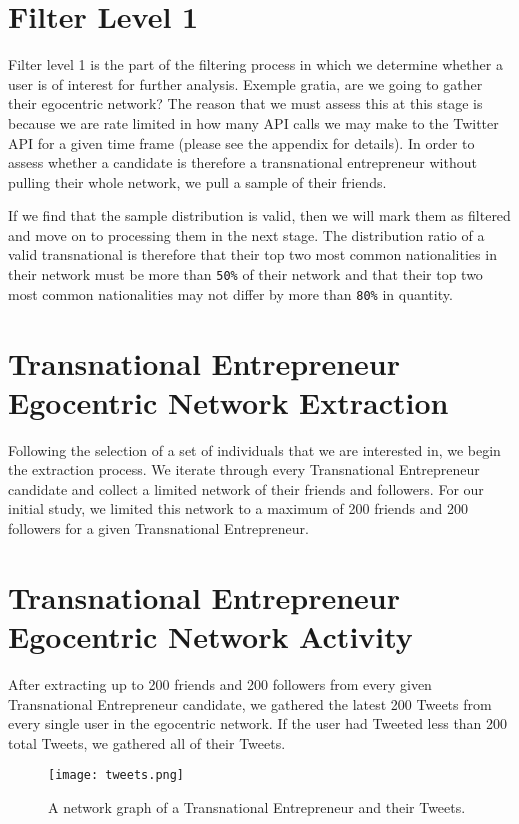 \section{Filter Level 1}
Filter level 1 is the part of the filtering process in which we
determine whether a user is of interest for further analysis. Exemple
gratia, are we going to gather their egocentric network? The reason
that we must assess this at this stage is because we are rate limited
in how many API calls we may make to the Twitter API for a given time
frame (please see the appendix for details). In order to assess
whether a candidate is therefore a transnational entrepreneur without
pulling their whole network, we pull a sample of their friends.

If we find that the sample distribution is valid, then we will mark
them as filtered and move on to processing them in the next stage. The
distribution ratio of a valid transnational is therefore that their
top two most common nationalities in their network must be more than
\verb|50%| of their network and that their top two most common
nationalities may not differ by more than \verb|80%| in quantity.

\section{Transnational Entrepreneur Egocentric Network Extraction}
Following the selection of a set of individuals that we are interested
in, we begin the extraction process. We iterate through every
Transnational Entrepreneur candidate and collect a limited network of
their friends and followers. For our initial study, we limited this
network to a maximum of 200 friends and 200 followers for a given
Transnational Entrepreneur.

\section{Transnational Entrepreneur Egocentric Network Activity}
After extracting up to 200 friends and 200 followers from every given
Transnational Entrepreneur candidate, we gathered the latest 200
Tweets from every single user in the egocentric network. If the user
had Tweeted less than 200 total Tweets, we gathered all of their
Tweets.

\begin{figure}[H]
  \centering
  \texttt{[image: tweets.png]}
  \caption{A network graph of a Transnational Entrepreneur and their Tweets.}
\end{figure}


